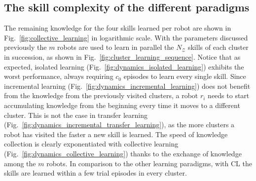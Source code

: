\subsection{The skill complexity of the different paradigms}
The remaining knowledge for the four skills learned per robot are shown in Fig.~\ref{fig:collective_learning} in logarithmic scale. With the parameters discussed previously the $m$ robots are used to learn in parallel the $N_\mathcal{Z}$ skills of each cluster in succession, as shown in Fig.~\ref{fig:cluster_learning_sequence}. Notice that as expected, isolated learning (Fig.~\ref{fig:dynamics_isolated_learning}) exhibits the worst performance, always requiring $c_0$ episodes to learn every single skill. Since incremental learning (Fig.~\ref{fig:dynamics_incremental_learning}) does not benefit from the knowledge from the previously visited clusters, a robot $r_i$ needs to start accumulating knowledge from the beginning every time it moves to a different cluster. This is not the case in transfer learning (Fig.~\ref{fig:dynamics_incremental_transfer_learning}), as the more clusters a robot has visited the faster a new skill is learned. The speed of knowledge collection is clearly exponentiated with collective learning (Fig.~\ref{fig:dynamics_collective_learning}) thanks to the exchange of knowledge among the $m$ robots. In comparison to the other learning paradigms, with CL the skills are learned within a few trial episodes in every cluster. 

